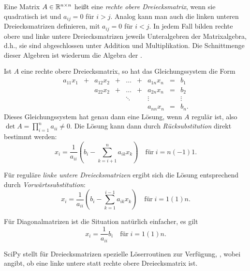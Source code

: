 \section{}

Eine Matrix $A\in\mathbb{R}^{n\times n}$ heißt eine \emph{rechte obere
  Dreiecksmatrix}, wenn sie quadratisch ist und $a_{ij}=0$ für $i>j$.
Analog kann man auch die linken unteren Dreiecksmatrizen definieren,
mit $a_{ij}=0$ für $i<j$. In jedem Fall bilden rechte obere und linke
untere Dreiecksmatrizen jeweils Unteralgebren der Matrixalgebra, d.h.,
sie sind abgeschlossen unter Addition und Multiplikation. Die
Schnittmenge dieser Algebren ist wiederum die Algebra der
\emph{}.

Ist $A$ eine rechte obere Dreiecksmatrix, so hat das Gleichungssystem
die Form
\begin{equation}
  \begin{matrix}
    a_{11}x_1 &+&  a_{12}x_2 &+& \ldots &+& a_{1n}x_n &=& b_1\\
             &&  a_{22}x_2 &+& \ldots &+& a_{2n}x_n &=& b_2\\
             &&            && \ddots && \vdots  && \vdots\\
             &&            &&        && a_{nn}x_n &=& b_n.
  \end{matrix}
\end{equation}
Dieses Gleichungssystem hat genau dann eine Lösung, wenn $A$ regulär
ist, also $\det A=\prod_{i=1}^na_{ii}\neq 0$. Die Lösung kann dann durch
\emph{Rücksubstitution} direkt bestimmt werden:
\begin{equation}
  \label{eq:ruecksubst}
  x_i = \frac{1}{a_{ii}}\left( b_i - \sum_{k=i+1}^n a_{ik}x_k\right)
  \quad\text{für}\; i=n(-1)1.
\end{equation}

Für reguläre \emph{linke untere Dreiecksmatrizen} ergibt sich die
Lösung entsprechend durch \emph{Vorwärtssubstitution}:
\begin{equation}
  \label{eq:vorwsubst}
  x_i = \frac{1}{a_{ii}}\left( b_i - \sum_{k=1}^{i-1} a_{ik}x_k\right)
  \quad\text{für}\; i=1(1)n.
\end{equation}

Für Diagonalmatrizen ist die Situation natürlich einfacher, es gilt
\begin{equation}
  x_i = \frac{1}{a_{ii}} b_i
  \quad\text{für}\; i=1(1)n.
\end{equation}

\begin{sloppypar}
  SciPy stellt für Dreiecksmatrizen spezielle Löserroutinen zur
  Verfügung, ,
  wobei  angibt, ob   eine linke untere statt rechte
  obere Dreiecksmatrix ist.
\end{sloppypar}

